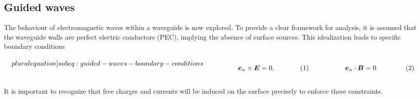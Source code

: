 \documentclass[11pt,a4paper,twoside,openany]{report}
\begin{document}
\subsection{Guided waves}
The behaviour of electromagnetic waves within a waveguide is now explored. To provide a clear framework for analysis, it is assumed that the waveguide walls are perfect electric conductors (PEC), implying the absence of surface sources. This idealization leads to specific boundary conditions\\
\begin{subequations}
    \label[pluralequation]{subeq:guided-waves-boundary-conditions}
    \noindent\centering
    \begin{minipage}{0.45\textwidth}
        \begin{align}
            \label{eq:guided-waves-boundary-condition-e}
            \vec e_n \times \vec E &= 0,
        \end{align}
    \end{minipage}
    \hfill
    \begin{minipage}{0.45\textwidth}
        \begin{align}
            \label{eq:guided-waves-boundary-condition-b}
            \vec e_n \cdot \vec B &= 0.
        \end{align}
    \end{minipage}\bigskip
\end{subequations}\\
It is important to recognize that free charges and currents will be induced on the surface precisely to enforce these constraints.
\end{document}
